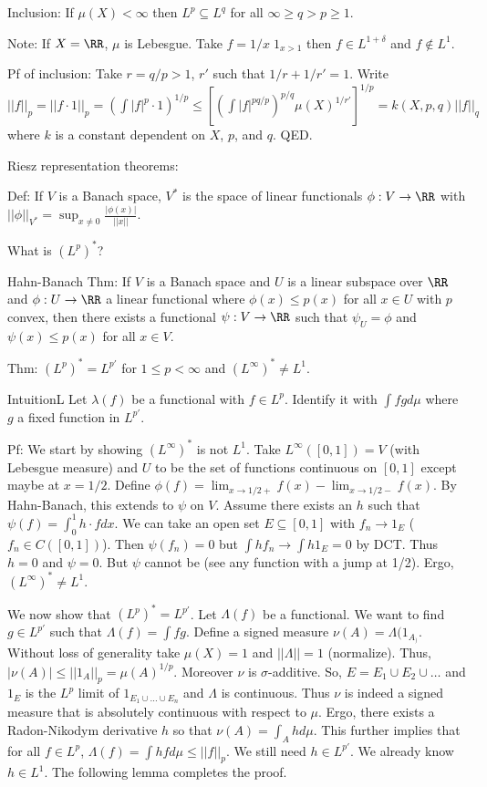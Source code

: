 \documentclass{../uva7310}
\begin{document}
Inclusion: If $\mu(X)<\infty$ then $L^p\subseteq L^q$ for all $\infty\geq q>p\geq 1$.

Note: If $X=\RR$, $\mu$ is Lebesgue. Take $f=1/x\; 1_{x>1}$ then $f\in L^{1+\delta}$ and $f\notin L^1$.

Pf of inclusion: Take $r=q/p>1$, $r'$ such that $1/r+1/r'=1$.
Write $||f||_p=||f\cdot 1||_p=\left(\int |f|^p\cdot 1\right)^{1/p}\leq \left[  \left(\int|f|^{pq/p}\right)^{p/q}\mu(X)^{1/r'} \right]^{1/p}=k(X,p,q)||f||_q$
where $k$ is a constant dependent on $X$, $p$, and $q$. QED.

Riesz representation theorems:

Def: If $V$ is a Banach space, $V^*$ is the space of linear functionals $\phi:V\rightarrow\RR$ with $||\phi||_{V^*}=\sup_{x\neq 0}\frac{|\phi(x)|}{||x||}$.

What is $(L^p)^*$?

Hahn-Banach Thm: If $V$ is a Banach space and $U$ is a linear subspace over $\RR$ and $\phi:U\rightarrow\RR$ a linear functional
where $\phi(x)\leq p(x)$ for all $x\in U$ with $p$ convex, then there exists a functional $\psi:V\rightarrow\RR$ such that
$\psi_U=\phi$ and $\psi(x)\leq p(x)$ for all $x\in V$. 

Thm: $(L^p)^*=L^{p'}$ for $1\leq p<\infty$ and $(L^\infty)^*\neq L^1$.

IntuitionL Let $\lambda(f)$ be a functional with $f\in L^p$. Identify it with $\int fgd\mu$ where $g$ a fixed function in $L^{p'}$.

Pf: 
We start by showing $(L^\infty)^*$ is not $L^1$. Take $L^\infty([0,1])=V$ (with Lebesgue measure) and $U$ to be the set of functions continuous on $[0,1]$
except maybe at $x=1/2$. Define $\phi(f)=\lim_{x\to 1/2 +} f(x)-\lim_{x\to 1/2 -}f(x)$. By Hahn-Banach, this extends to $\psi$ on $V$.
Assume there exists an $h$ such that $\psi(f)=\int_0^1 h\cdot f d x$. We can take an open set $E\subseteq [0,1]$ with $f_n\to 1_E$ ($f_n\in C([0,1])$).
Then $\psi(f_n)=0$ but $\int h f_n\to \int h 1_E=0$ by DCT. Thus $h=0$ and $\psi=0$. But $\psi$ cannot be (see any function with a jump at 1/2).
Ergo, $(L^\infty)^*\neq L^1$.

We now show that $(L^p)^*=L^{p'}$. Let $\Lambda(f)$ be a functional. We want to find $g\in L^{p'}$ such that $\Lambda(f)=\int fg$.
Define a signed measure $\nu(A)=\Lambda (1_A_)$. Without loss of generality take $\mu(X)=1$ and $||\Lambda||=1$ (normalize).
Thus, $|\nu(A)|\leq ||1_A||_p=\mu(A)^{1/p}$. Moreover $\nu$ is $\sigma$-additive. So, $E=E_1\cup E_2\cup\ldots$ and
$1_E$ is the $L^p$ limit of $1_{E_1\cup \dots\cup E_n}$ and $\Lambda$ is continuous. Thus $\nu$ is indeed a signed measure
that is absolutely continuous with respect to $\mu$. Ergo, there exists a Radon-Nikodym derivative $h$ so that
$\nu(A)=\int_A h d\mu$. This further implies that for all $f\in L^p$, $\Lambda(f)=\int hf d\mu\leq ||f||_p$. We still need $h\in L^{p'}$.
We already know $h\in L^1$. The following lemma completes the proof.
\end{document}
